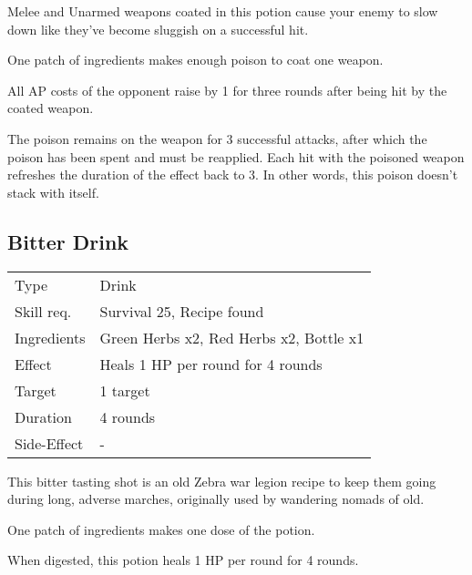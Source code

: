 \documentclass[11pt,a4paper,twocolumn]{book}
\begin{document}
\medskip

Melee and Unarmed weapons coated in this potion cause your enemy to slow down like they've become sluggish on a successful hit.

One patch of ingredients makes enough poison to coat one weapon.

All AP costs of the opponent raise by 1 for three rounds after being hit by the coated weapon.

The poison remains on the weapon for 3 successful attacks, after which the poison has been spent and must be reapplied. Each hit with the poisoned weapon refreshes the duration of the effect back to 3. In other words, this poison doesn't stack with itself.



\subsection*{Bitter Drink}
{
	\begin{tabu} to 75mm{| X[l,4] | X[l,8] |}
		\hline
		Type 			& Drink 													\\
		Skill req.	    & Survival 25, Recipe found 								\\
		Ingredients     & Green Herbs x2, Red Herbs x2, Bottle x1					\\
		Effect     		& Heals 1 HP per round for 4 rounds							\\
		Target      	& 1 target													\\
		Duration  		& 4 rounds	 												\\
		Side-Effect     & -											\\ \hline
	\end{tabu}
	
}

\medskip

This bitter tasting shot is an old Zebra war legion recipe to keep them going during long, adverse marches, originally used by wandering nomads of old.

One patch of ingredients makes one dose of the potion.

When digested, this potion heals 1 HP per round for 4 rounds.

\vfill
\end{document}
